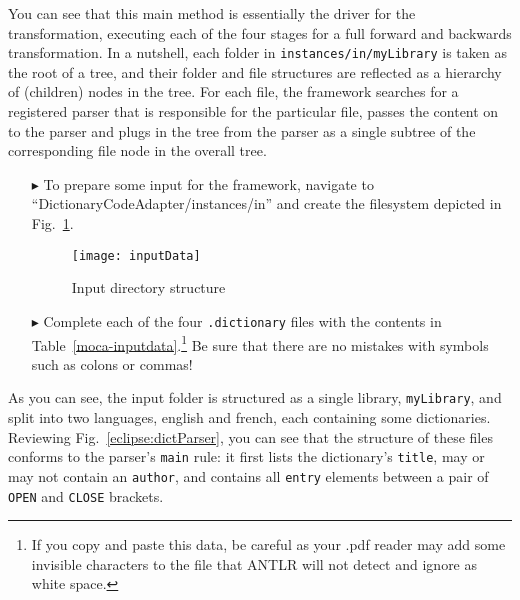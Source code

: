 You can see that this main method is essentially the driver for the transformation, executing each of the four stages for a full forward and backwards
transformation. In a nutshell, each folder in \texttt{instances/in/myLibrary} is taken as the root of a tree, and their folder and file structures are reflected
as a hierarchy of (children) nodes in the tree. For each file, the framework searches for a registered parser that is responsible for the particular file,
passes the content on to the parser and plugs in the tree from the parser as a single subtree of the corresponding file node in the overall tree.

\begin{itemize}


\item[$\blacktriangleright$] To prepare some input for the framework, navigate to ``DictionaryCodeAdapter/instances/in'' and create the
filesystem depicted in Fig.~\ref{eclipse:textDirectory}. 

\begin{figure}[htp]
\begin{center}
  \texttt{[image: inputData]}
  \caption{Input directory structure}
  \label{eclipse:textDirectory}
\end{center}
\end{figure}

\item[$\blacktriangleright$] Complete each of the four \texttt{.dictionary} files with the contents in Table~\ref{moca-inputdata}.\footnote{If you copy and
paste this data, be careful as your .pdf reader may add some invisible characters to the file that ANTLR will not detect and ignore as white space.} Be sure
that there are no mistakes with symbols such as colons or commas!

\end{itemize}

As you can see, the input folder is structured as a single library, \texttt{myLibrary}, and split into two languages, english and french, each containing
some dictionaries. Reviewing Fig.~\ref{eclipse:dictParser}, you can see that the structure of these files conforms to the parser's \texttt{main} rule: it
first lists the dictionary's \texttt{title}, may or may not contain an \texttt{author}, and contains all \texttt{entry} elements between a pair of \texttt{OPEN}
and \texttt{CLOSE} brackets.

